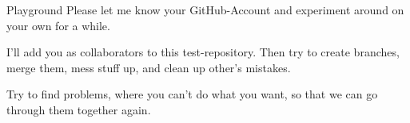 \documentclass[en]{sdqbeamer}
\begin{document}
\begin{frame}{Playground}
    Please let me know your GitHub-Account and experiment around on your own for a while.
    \vspace{12pt}
    
    I'll add you as collaborators to this test-repository. Then try to create branches, merge them, mess stuff up, and clean up other's mistakes.
    \vspace{12pt}
    
    Try to find problems, where you can't do what you want, so that we can go through them together again.
\end{frame}
\end{document}
